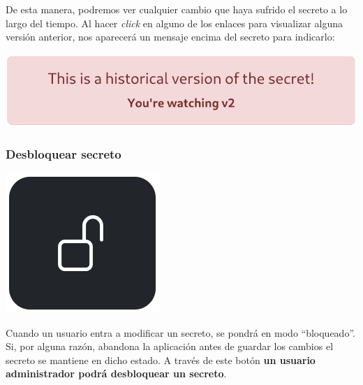 \documentclass{\ClassPath/viu-tfm-template}
\begin{document}
De esta manera, podremos ver cualquier cambio que haya sufrido el secreto a lo largo del tiempo. Al hacer \textit{click} en alguno de los enlaces para visualizar alguna versión anterior, nos aparecerá un mensaje encima del secreto para indicarlo:
\vspace{-8pt}
\begin{center}
    \includegraphics[width=0.6\linewidth]{img/history2.png}
\end{center}

\subsubsection*{Desbloquear secreto}
{
\begin{minipage}{0.1\linewidth}
    \includegraphics[width=\linewidth]{img/unlock.png}
\end{minipage}
\hspace{0.5cm}
\begin{minipage}{0.9\linewidth}
    Cuando un usuario entra a modificar un secreto, se pondrá en modo “bloqueado”. Si, por alguna razón, abandona la aplicación antes de guardar los cambios el secreto se mantiene en dicho estado. A través de este botón \textbf{un usuario administrador podrá desbloquear un secreto}.
\end{minipage}
}
\end{document}
